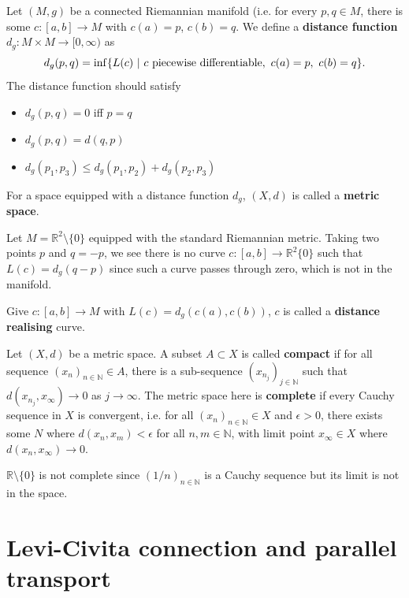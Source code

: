\documentclass[letter-paper]{tufte-book}
\newenvironment{example}[1][Example]{\begin{trivlist}
\item[\hskip \labelsep {\bfseries #1}]}{\end{trivlist}}
\begin{document}
Let $(M,g)$ be a connected Riemannian manifold (i.e. for every $p,q\in M$, there is some $c : [a,b] \to M$ with $c(a)=p$, $c(b)=q$. We define a \textbf{distance function} $d_g : M\times M \to [0, \infty)$ as
\begin{equation}
  d_g(p,q) = \inf\{ L(c)\ |\ c\textnormal{ piecewise differentiable},\ c(a) = p,\ c(b) = q\}.
\end{equation}
The distance function should satisfy
\begin{itemize}
  \item $d_g(p,q) = 0$ iff $p=q$
  \item $d_g(p,q) = d(q,p)$
  \item $d_g(p_1, p_3) \leq d_g(p_1, p_2) + d_g(p_2, p_3)$
\end{itemize}
For a space equipped with a distance function $d_g$, $(X,d)$ is called a \textbf{metric space}.

\begin{example}
  Let $M = \mathbb{R}^2 \setminus \{0\}$ equipped with the standard Riemannian metric. Taking two points $p$ and $q=-p$, we see there is no curve $c:[a,b]\to \mathbb{R}^2\{0\}$ such that $L(c) = d_g(q-p)$ since such a curve passes through zero, which is not in the manifold.
\end{example}

Give $c:[a,b] \to M$ with $L(c) = d_g(c(a), c(b))$, $c$ is called a \textbf{distance realising} curve.

Let $(X, d)$ be a metric space. A subset $A \subset X$ is called \textbf{compact} if for all sequence $(x_n)_{n\in\mathbb{N}} \in A$, there is a sub-sequence $(x_{n_j})_{j\in\mathbb{N}}$ such that $d(x_{n_j}, x_\infty) \to 0$ as $j\to\infty$. The metric space here is \textbf{complete} if every Cauchy sequence in $X$ is convergent, i.e. for all $(x_n)_{n\in\mathbb{N}} \in X$ and $\epsilon>0$, there exists some $N$ where $d(x_n, x_m) < \epsilon$ for all $n,m\in\mathbb{N}$, with limit point $x_\infty \in X$ where $d(x_n, x_\infty)\to 0$.

\begin{example}
  $\mathbb{R} \setminus \{0\}$ is not complete since $(1/n)_{n\in \mathbb{N}}$ is a Cauchy sequence but its limit is not in the space.
\end{example}


\chapter{Levi-Civita connection and parallel transport}
\end{document}
